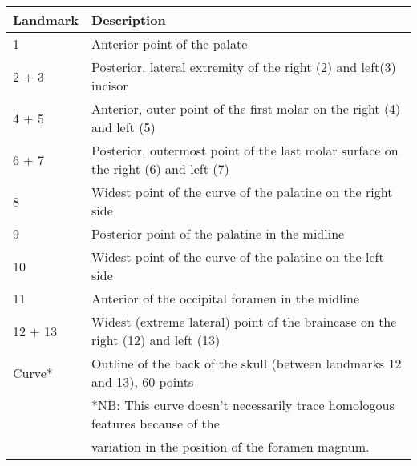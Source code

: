\begin{tabular}[t]{p{3cm} l}		
\hline
\textbf{Landmark} & \textbf{Description} \\
\hline
1 & Anterior point of the palate\\
2 + 3 & Posterior, lateral extremity of the right (2) and left(3) incisor\\
4 + 5 & Anterior, outer point of the first molar on the right (4) and left (5)\\
6 + 7 & Posterior, outermost point of the last molar surface on the right (6) and left (7) \\
8 & Widest point of the curve of the palatine on the right side\\
9 & Posterior point of the palatine in the midline\\
10 & Widest point of the curve of the palatine on the left side\\
11 & Anterior of the occipital foramen in the midline\\
12 + 13 & Widest (extreme lateral) point of the braincase on the right (12) and left (13)\\
Curve* & Outline of the back of the skull (between landmarks 12 and 13), 60 points \\
\hline
&*NB: This curve doesn't necessarily trace homologous features because of the \\ 
& variation in the position of the foramen magnum.
\end{tabular}